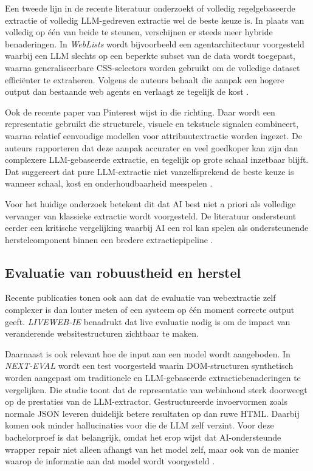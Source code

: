 Een tweede lijn in de recente literatuur onderzoekt of volledig regelgebaseerde extractie of volledig LLM-gedreven extractie wel de beste keuze is. In plaats van volledig op één van beide te steunen, verschijnen er steeds meer hybride benaderingen. In \textit{WebLists} wordt bijvoorbeeld een agentarchitectuur voorgesteld waarbij een LLM slechts op een beperkte subset van de data wordt toegepast, waarna generaliseerbare CSS-selectors worden gebruikt om de volledige dataset efficiënter te extraheren. Volgens de auteurs behaalt die aanpak een hogere output dan bestaande web agents en verlaagt ze tegelijk de kost \autocite{bohra2025weblists}.

Ook de recente paper van Pinterest wijst in die richting. Daar wordt een representatie gebruikt die structurele, visuele en tekstuele signalen combineert, waarna relatief eenvoudige modellen voor attribuutextractie worden ingezet. De auteurs rapporteren dat deze aanpak accurater en veel goedkoper kan zijn dan complexere LLM-gebaseerde extractie, en tegelijk op grote schaal inzetbaar blijft. Dat suggereert dat pure LLM-extractie niet vanzelfsprekend de beste keuze is wanneer schaal, kost en onderhoudbaarheid meespelen \autocite{farag2025pinterest}.

Voor het huidige onderzoek betekent dit dat AI best niet a priori als volledige vervanger van klassieke extractie wordt voorgesteld. De literatuur ondersteunt eerder een kritische vergelijking waarbij AI een rol kan spelen als ondersteunende herstelcomponent binnen een bredere extractiepipeline \autocite{marineli2025controlplanes, bohra2025weblists, farag2025pinterest}.

\subsection{Evaluatie van robuustheid en herstel}
\label{subsec:lit-evaluatie}

Recente publicaties tonen ook aan dat de evaluatie van webextractie zelf complexer is dan louter meten of een systeem op één moment correcte output geeft. \textit{LIVEWEB-IE} benadrukt dat live evaluatie nodig is om de impact van veranderende websitestructuren zichtbaar te maken.

Daarnaast is ook relevant hoe de input aan een model wordt aangeboden. In \textit{NEXT-EVAL} wordt een test voorgesteld waarin DOM-structuren synthetisch worden aangepast om traditionele en LLM-gebaseerde extractiebenaderingen te vergelijken. Die studie toont dat de representatie van webinhoud sterk doorweegt op de prestaties van de LLM-extractor. Gestructureerde invoervormen zoals normale JSON leveren duidelijk betere resultaten op dan ruwe HTML. Daarbij komen ook minder hallucinaties voor die de LLM zelf verzint. Voor deze bachelorproef is dat belangrijk, omdat het erop wijst dat AI-ondersteunde wrapper repair niet alleen afhangt van het model zelf, maar ook van de manier waarop de informatie aan dat model wordt voorgesteld \autocite{kurkin2025nexteval}.

